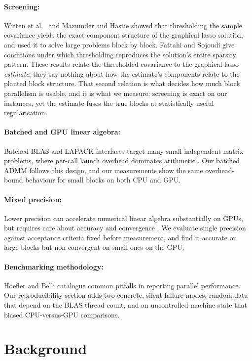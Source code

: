 \documentclass[pdflatex,sn-mathphys-num]{sn-jnl}
\begin{document}
\paragraph{Screening:} Witten et al.\ \cite{witten2011} and Mazumder and Hastie
\cite{mazumder2012} showed that thresholding the sample covariance yields the
exact component structure of the graphical lasso solution, and used it to
solve large problems block by block. Fattahi and Sojoudi \cite{fattahi2019}
give conditions under which thresholding reproduces the solution's entire
sparsity pattern. These results relate the thresholded covariance to the
graphical lasso \emph{estimate}; they say nothing about how the estimate's
components relate to the planted block structure. That second relation is
what decides how much block parallelism is usable, and it is what we
measure: screening is exact on our instances, yet the estimate fuses the true
blocks at statistically useful regularisation.
\paragraph{Batched and GPU linear algebra:} Batched BLAS and LAPACK interfaces
target many small independent matrix problems, where per-call launch overhead
dominates arithmetic \cite{dongarra2017batched}. Our batched ADMM follows
this design, and our measurements show the same overhead-bound behaviour for
small blocks on both CPU and GPU.
\paragraph{Mixed precision:} Lower precision can accelerate numerical linear
algebra substantially on GPUs, but requires care about accuracy and
convergence \cite{higham2022mixed,abdelfattah2021survey}. We evaluate single
precision against acceptance criteria fixed before measurement, and find it
accurate on large blocks but non-convergent on small ones on the GPU.
\paragraph{Benchmarking methodology:} Hoefler and Belli \cite{hoefler2015}
catalogue common pitfalls in reporting parallel performance. Our
reproducibility section adds two concrete, silent failure modes: random data
that depend on the BLAS thread count, and an uncontrolled machine state that
biased CPU-versus-GPU comparisons.
\section{Background}
\end{document}
